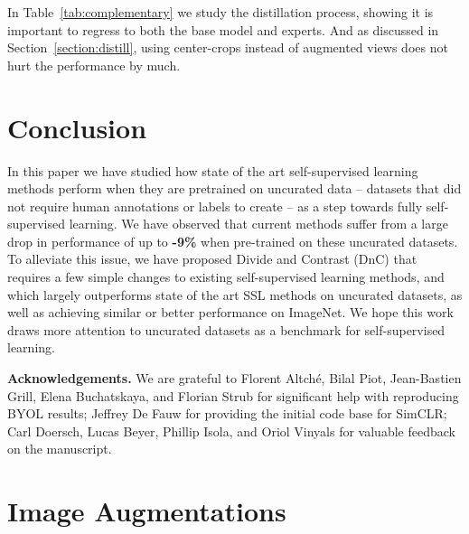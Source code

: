 \documentclass[final]{cvpr}
\newcommand\showdiffn[1]{\textbf{\textcolor{nicered}{#1}}}
\begin{document}
In Table~\ref{tab:complementary} we study the distillation process, showing it is important to regress to both the base model and experts. And as discussed in Section~\ref{section:distill}, using center-crops instead of augmented views does not hurt the performance by much.
 \section{Conclusion}
In this paper we have studied how state of the art self-supervised learning methods perform when they are pretrained on uncurated data -- datasets that did not require human annotations or labels to create -- as a step towards fully self-supervised learning. We have observed that current methods suffer from a large drop in performance of up to \showdiffn{-9\%} when pre-trained on these uncurated datasets. To alleviate this issue, we have proposed Divide and Contrast (DnC) that requires a few simple changes to existing self-supervised learning methods, and which largely outperforms state of the art SSL methods on uncurated datasets, as well as achieving similar or better performance on ImageNet. We hope this work draws more attention to uncurated datasets as a benchmark for self-supervised learning.

\vspace{5pt}
\noindent \textbf{Acknowledgements.} We are grateful to Florent Altché, Bilal Piot, Jean-Bastien Grill, Elena Buchatskaya, and Florian Strub for significant help with reproducing BYOL results; Jeffrey De Fauw for providing the initial code base for SimCLR; Carl Doersch, Lucas Beyer, Phillip Isola, and Oriol Vinyals for valuable feedback on the manuscript. 
 


{\small


}

\clearpage
\appendix

\section{Image Augmentations}
\label{app:transf}
\end{document}
